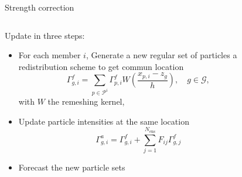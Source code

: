 \documentclass[aspectratio=169]{beamer} %
\begin{document}
\begin{frame}{Strength correction}
    \begin{columns}
        \begin{column}{0.6\textwidth}
            Update in three steps:
            \begin{itemize}
                \item For each member $i$, Generate a new regular set of particles a redistribution scheme to get commun location~\footnotemark[1]
                      \begin{equation*}
                          \Gamma^f_{g, i} = \sum_{p \in \mathcal P^i} \Gamma^f_{p, i} W(\frac{x_{p, i} - z_g}{h}), \quad g \in \mathcal G,
                      \end{equation*}
                      with $W$ the remeshing kernel,
                \item Update particle intensities at the same location
                      \begin{equation*}
                          \Gamma^a_{g, i} = \Gamma^f_{g, i} + \sum_{j=1}^{N_{\text{ens}}} F_{ij} \Gamma^f_{g,j}
                      \end{equation*}
                \item Forecast the new particle sets
            \end{itemize}
        \end{column}
        \hspace{-0.2cm}
        \begin{column}{0.3\textwidth}
            \begin{figure}

\end{figure}
\end{column}
\end{columns}
\end{frame}
\end{document}

